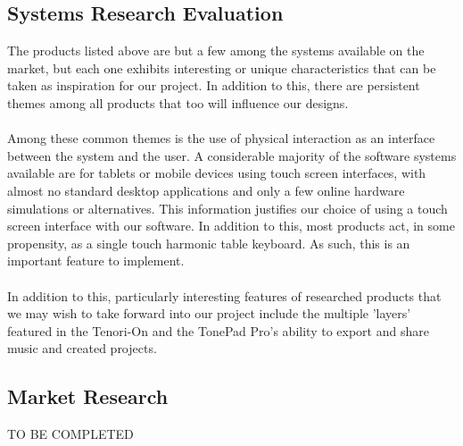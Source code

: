\documentclass[10pt,a4paper]{article}
\begin{document}
\subsection{Systems Research Evaluation}
The products listed above are but a few among the systems available on the market, but each one exhibits interesting or unique characteristics that can be taken as inspiration for our project. In addition to this, there are persistent themes among all products that too will influence our designs.\\
\\
Among these common themes is the use of physical interaction as an interface between the system and the user. A considerable majority of the software systems available are for tablets or mobile devices using touch screen interfaces, with almost no standard desktop applications and only a few online hardware simulations or alternatives. This information justifies our choice of using a touch screen interface with our software. In addition to this, most products act, in some propensity, as a single touch harmonic table keyboard. As such, this is an important feature to implement.\\
\\
In addition to this, particularly interesting features of researched products that we may wish to take forward into our project include the multiple 'layers' featured in the Tenori-On and the TonePad Pro's ability to export and share music and created projects. 

\subsection{Market Research}
TO BE COMPLETED
\end{document}

